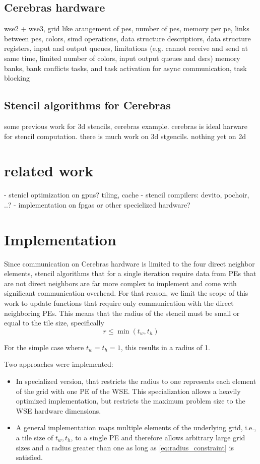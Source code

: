 \documentclass{article}
\begin{document}
\subsection{Cerebras hardware}
wse2 + wse3, grid like arangement of pes, number of pes, memory per pe, links between pes, colors, simd operations, data structure descriptiors, data structure registers, input and output queues, limitations (e.g. cannot receive and send at same time, limited number of colors, input output queues and dsrs)
memory banks, bank conflicts
tasks, and task activation for async communication, task blocking
\subsection{Stencil algorithms for Cerebras}
some previous work for 3d stencils, cerebras example.
cerebras is ideal harware for stencil computation. 
there is much work on 3d stgencils. nothing yet on 2d
\section{related work}
- stenicl optimization on gpus? tiling, cache
- stencil compilers: devito, pochoir, ..?
- implementation on fpgas or other specielized hardware?



\section{Implementation}
Since communication on Cerebras hardware is limited to the four direct neighbor elements, stencil algorithms that for a single iteration require data from PEs that are not direct neighbors are far more complex to implement and come with significant communication overhead. For that reason, we limit the scope of this work to update functions that require only communication with the direct neighboring PEs. This means that the radius of the stencil must be small or equal to the tile size, specifically
\begin{equation}    
\label{eq:radius_constraint}
r \leq \min(t_w, t_h)
\end{equation}

For the simple case where $t_w=t_h=1$, this results in a radius of 1.

Two approaches were implemented:
\begin{itemize}
    \item In specialized version, that restricts the radius to one represents each element of the grid with one PE of the WSE. This specialization allows a heavily optimized implementation, but restricts the maximum problem size to the WSE hardware dimensions.
    \item A general implementation maps multiple elements of the underlying grid, i.e., a tile size of $t_w, t_h$, to a single PE and therefore allows arbitrary large grid sizes and a radius greater than one as long as \ref{eq:radius_constraint} is satisfied. 
\end{itemize}
\end{document}
